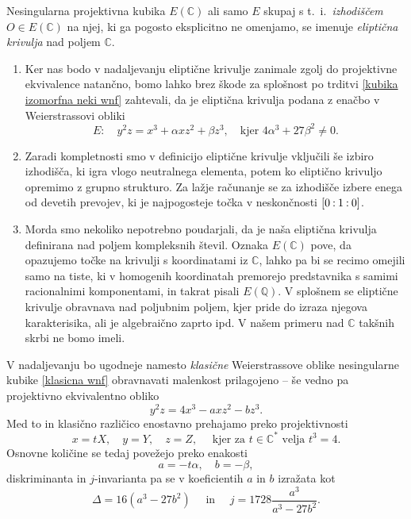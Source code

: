 \documentclass[mat1]{fmfdelo}
\numberwithin{equation}{section}
\newcommand{\C}{\mathbb C}
\newcommand{\CM}{\mathbb C ^*}
\newcommand{\Q}{\mathbb Q}
\newcommand{\pcoor}[1]{%
\begingroup\lccode`~=`: \lowercase{\endgroup
\edef~}{\mathbin{\mathchar\the\mathcode`:}\nobreak}%
\left[%
\begingroup
\mathcode`:=\string"8000
#1%
\endgroup
\right]%
}
\newcommand{\ti}{t.~i.\ }
\theoremstyle{definition}
\begin{document}
\begin{definicija}
    Nesingularna projektivna kubika $E(\C)$ ali samo $E$ skupaj s \ti \emph{izhodiščem} $O \in E(\C)$ na njej, ki ga pogosto eksplicitno ne omenjamo, se imenuje \emph{eliptična krivulja} nad poljem $\C$. 
\end{definicija}

\begin{opomba}
    \begin{enumerate}
        \item
        Ker nas bodo v nadaljevanju eliptične krivulje zanimale zgolj do projektivne ekvivalence natančno, bomo lahko brez škode za splošnost po trditvi \ref{kubika izomorfna neki wnf} zahtevali, da je eliptična krivulja podana z enačbo v Weierstrassovi obliki
        \[
            E: \quad y^2z = x^3 + \alpha x z^2 + \beta z^3,  \quad \text{kjer $4\alpha^3 + 27\beta^2 \neq 0$.}
        \]  
     
        \item 
        Zaradi kompletnosti smo v definicijo eliptične krivulje vključili še izbiro izhodišča, ki igra vlogo neutralnega elementa, potem ko eliptično krivuljo opremimo z grupno strukturo. Za lažje računanje se za izhodišče izbere enega od devetih prevojev, ki je najpogosteje točka v neskončnosti $\pcoor{0:1:0}$.  
        \item 
        Morda smo nekoliko nepotrebno poudarjali, da je naša eliptična krivulja definirana nad poljem kompleksnih števil. Oznaka $E(\C)$ pove, da opazujemo točke na krivulji s koordinatami iz $\C$, lahko pa bi se recimo omejili samo na tiste, ki v homogenih koordinatah premorejo predstavnika s samimi racionalnimi komponentami, in takrat pisali $E(\Q)$. V splošnem se eliptične krivulje obravnava nad poljubnim poljem, kjer pride do izraza njegova karakterisika, ali je algebraično zaprto ipd. V našem primeru nad $\C$ takšnih skrbi ne bomo imeli. 
    \end{enumerate}
\end{opomba}

V nadaljevanju bo ugodneje namesto \emph{klasične} Weierstrassove oblike nesingularne kubike \eqref{klasicna wnf} obravnavati malenkost prilagojeno -- še vedno pa projektivno ekvivalentno obliko
\[
    y^2z = 4x^3 - axz^2 - bz^3.  
\]
Med to in klasično različico enostavno prehajamo preko projektivnosti
\[
    x = tX, \quad y = Y, \quad z = Z, \quad \text{ kjer za } t \in \CM \text{ velja } t^3 = 4.   
\]
Osnovne količine se tedaj povežejo preko enakosti
\[
    a = -t\alpha, \quad b = -\beta,    
\]
diskriminanta in $j$-invarianta pa se v koeficientih $a$ in $b$ izražata kot
\begin{equation}
    \label{transformacija diskriminante in j-invariante}    
    \Delta = 16(a^3 - 27b^2) \quad \text{ in } \quad j = 1728\frac{a^3}{a^3 - 27b^2}.
\end{equation}
\end{document}
